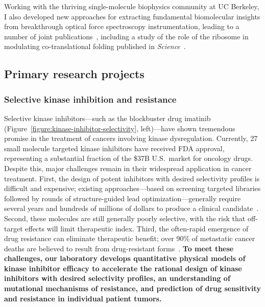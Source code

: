 \documentclass[10pt]{article}
\begin{document}
Working with the thriving single-molecule biophysics community at UC Berkeley, I also developed new approaches for extracting fundamental biomolecular insights from breakthrough optical force spectroscopy instrumentation, leading to a number of joint publications~\cite{elms:biophys-j:2012:constant-force-feedback,elms:pnas:2012:molten-globule,chodera:2011:rate-theory,bhmm}, including a study of the role of the ribosome in modulating co-translational folding published in \emph{Science}~\cite{kaiser:2011:ribosome-folding}.

\eject

\subsection*{Primary research projects}

\vspace{-0.3cm}
\subsubsection*{Selective kinase inhibition and resistance}
\vspace{-0.3cm}

Selective kinase inhibitors---such as the blockbuster drug imatinib (Figure~\ref{figure:kinase-inhibitor-selectivity}, left)---have shown tremendous promise in the treatment of cancers involving kinase dysregulation.
Currently, 27 small molecule targeted kinase inhibitors have received FDA approval, representing a substantial fraction of the \$37B U.S.~market for oncology drugs.
Despite this, major challenges remain in their widespread application in cancer treatment.
First, the design of potent inhibitors with desired selectivity profiles is difficult and expensive; existing approaches---based on screening targeted libraries followed by rounds of structure-guided lead optimization---generally require several years and hundreds of millions of dollars to produce a clinical candidate~\cite{paul:2010:nrdd:pharma-research-development}.
Second, these molecules are still generally poorly selective, with the risk that off-target effects will limit therapeutic index.
Third, the often-rapid emergence of drug resistance can eliminate therapeutic benefit; over 90\% of metastatic cancer deaths are believed to result from drug-resistant forms~\cite{longley-johnston:j-pathol:2005:drug-resistance}.
{\bf To meet these challenges, our laboratory develops quantitative physical models of kinase inhibitor efficacy to accelerate the rational design of kinase inhibitors with desired selectivity profiles, an understanding of mutational mechanisms of resistance, and prediction of drug sensitivity and resistance in individual patient tumors.}
\end{document}
